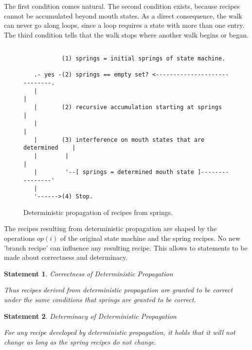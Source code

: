 \documentclass[12pt,a4paper]{scrartcl}
\newtheorem{statement}{Statement}
\begin{document}
The first condition comes natural. The second condition exists, because recipes
cannot be accumulated beyond mouth states. As a direct consequence, the walk
can never go along loops, since a loop requires a state with more than one
entry. The third condition tells that the walk stops where another walk begins
or began.  

\begin{figure}[htbp] \leavevmode \label{fig:algo-1}
\begin{verbatim}
   
           (1) springs = initial springs of state machine.

   .- yes -(2) springs == empty set? <-----------------------------.
   |                                                               |
   |       (2) recursive accumulation starting at springs          |
   |                                                               |
   |       (3) interference on mouth states that are determined    |
   |        |                                                      |
   |        '--[ springs = determined mouth state ]----------------'
   |
   '------>(4) Stop.

\end{verbatim}

\caption{Deterministic propagation of recipes from springs.}
\end{figure}

The recipes resulting from deterministic propagation are shaped by the 
operations $op(i)$ of the original state machine and the spring recipes. No
new 'branch recipe' can influence any resulting recipe. This allows to 
statements to be made about correctness and determinacy.

\begin{statement} Correctness of Deterministic Propagation \label{stm:correctness-rule}
    
    Thus recipes derived from deterministic propagation are granted
    to be correct under the same conditions that springs are granted to be
    correct.

\end{statement}

\begin{statement} Determinacy of Deterministic Propagation \label{stm:determinacy-rule}

    For any recipe developed by deterministic propagation, it holds that it 
    will not change as long as the spring recipes do not change.

\end{statement}
\end{document}
